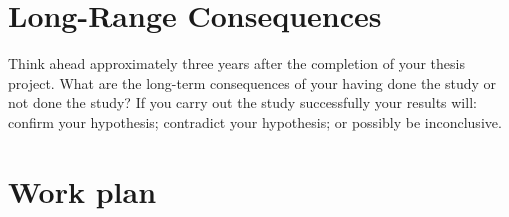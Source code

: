 \section{Long-Range Consequences}
Think ahead approximately three years after the completion of your thesis project. What are the long-term consequences of your having done the study or not done the study?
If you carry out the study successfully your results will: confirm your hypothesis; contradict your hypothesis; or possibly be inconclusive.

\section{Work plan}
